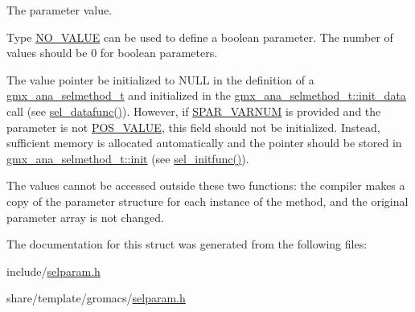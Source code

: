 \-The parameter value. 

\-Type \hyperlink{share_2template_2gromacs_2selvalue_8h_a70b42b87d434580bf1493591857b8beca4d694119ce83b62d74ff06b5e017dca8}{\-N\-O\-\_\-\-V\-A\-L\-U\-E} can be used to define a boolean parameter. \-The number of values should be 0 for boolean parameters.

\-The value pointer be initialized to \-N\-U\-L\-L in the definition of a {\ttfamily \hyperlink{structgmx__ana__selmethod__t}{gmx\-\_\-ana\-\_\-selmethod\-\_\-t}} and initialized in the {\ttfamily \hyperlink{structgmx__ana__selmethod__t_af844fcaa1c2be666b4a8558aa0dd31c2}{gmx\-\_\-ana\-\_\-selmethod\-\_\-t\-::init\-\_\-data}} call (see \hyperlink{include_2selmethod_8h_a5acbf2d7bead71c4d96f9e69b267df56}{sel\-\_\-datafunc()}). \-However, if \hyperlink{share_2template_2gromacs_2selparam_8h_a400330277d7e17cdfef1610cc37838ea}{\-S\-P\-A\-R\-\_\-\-V\-A\-R\-N\-U\-M} is provided and the parameter is not \hyperlink{share_2template_2gromacs_2selvalue_8h_a70b42b87d434580bf1493591857b8beca31a47fbfbc85ad1472ce3d2a168fd1ec}{\-P\-O\-S\-\_\-\-V\-A\-L\-U\-E}, this field should not be initialized. \-Instead, sufficient memory is allocated automatically and the pointer should be stored in {\ttfamily \hyperlink{structgmx__ana__selmethod__t_ab8c8ba47a888095b9635219f488b4a0f}{gmx\-\_\-ana\-\_\-selmethod\-\_\-t\-::init}} (see \hyperlink{include_2selmethod_8h_a112e5ec6891c5963a59384cf41f0cc89}{sel\-\_\-initfunc()}).

\-The values cannot be accessed outside these two functions\-: the compiler makes a copy of the parameter structure for each instance of the method, and the original parameter array is not changed. 

\-The documentation for this struct was generated from the following files\-:\begin{DoxyCompactItemize}
\item 
include/\hyperlink{include_2selparam_8h}{selparam.\-h}\item 
share/template/gromacs/\hyperlink{share_2template_2gromacs_2selparam_8h}{selparam.\-h}\end{DoxyCompactItemize}
